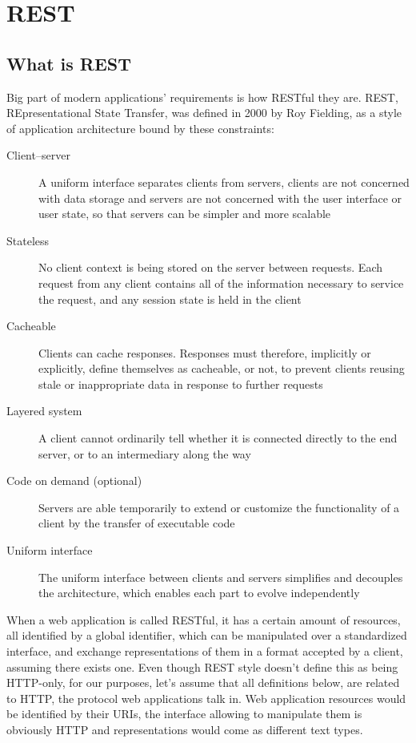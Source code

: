 \chapter{REST}

\section{What is REST}

Big part of modern applications' requirements is how RESTful they are. REST\citep{rest}, REpresentational State Transfer, was defined in 2000 by Roy Fielding, as a style of application architecture bound by these constraints:

\begin{description}
  \item[Client–server] A uniform interface separates clients from servers, clients are not concerned with data storage and servers are not concerned with the user interface or user state, so that servers can be simpler and more scalable
  \item[Stateless] No client context is being stored on the server between requests. Each request from any client contains all of the information necessary to service the request, and any session state is held in the client
  \item[Cacheable] Clients can cache responses. Responses must therefore, implicitly or explicitly, define themselves as cacheable, or not, to prevent clients reusing stale or inappropriate data in response to further requests
  \item[Layered system] A client cannot ordinarily tell whether it is connected directly to the end server, or to an intermediary along the way
  \item[Code on demand (optional)] Servers are able temporarily to extend or customize the functionality of a client by the transfer of executable code
  \item[Uniform interface] The uniform interface between clients and servers simplifies and decouples the architecture, which enables each part to evolve independently
\end{description}

When a web application is called RESTful, it has a certain amount of resources, all identified by a global identifier, which can be manipulated over a standardized interface, and exchange representations of them in a format accepted by a client, assuming there exists one. Even though REST style doesn't define this as being HTTP-only, for our purposes, let's assume that all definitions below, are related to HTTP, the protocol web applications talk in. Web application resources would be identified by their URIs, the interface allowing to manipulate them is obviously HTTP and representations would come as different text types.

